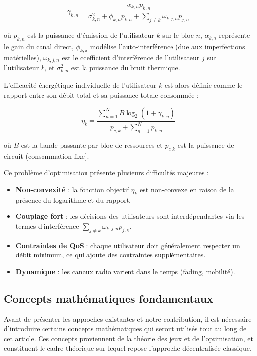 \documentclass[conference]{IEEEtran}
\begin{document}
\begin{equation} \label{eq:sinr_general}
\gamma_{k,n} = \frac{\alpha_{k,n} p_{k,n}}{\sigma_{k,n}^2 + \phi_{k,n} p_{k,n} + \sum_{j \neq k} \omega_{k,j,n} p_{j,n}}
\end{equation}

où $p_{k,n}$ est la puissance d'émission de l'utilisateur $k$ sur le bloc $n$, $\alpha_{k,n}$ représente le gain du canal direct, $\phi_{k,n}$ modélise l'auto-interférence (due aux imperfections matérielles), $\omega_{k,j,n}$ est le coefficient d'interférence de l'utilisateur $j$ sur l'utilisateur $k$, et $\sigma_{k,n}^2$ est la puissance du bruit thermique.

L'efficacité énergétique individuelle de l'utilisateur $k$ est alors définie comme le rapport entre son débit total et sa puissance totale consommée :

\begin{equation} \label{eq:ee}
\eta_k = \frac{\displaystyle\sum_{n=1}^{N} B \log_2(1 + \gamma_{k,n})}{p_{c,k} + \displaystyle\sum_{n=1}^{N} p_{k,n}}
\end{equation}

où $B$ est la bande passante par bloc de ressources et $p_{c,k}$ est la puissance de circuit (consommation fixe).

Ce problème d'optimisation présente plusieurs difficultés majeures :
\begin{itemize}
    \item \textbf{Non-convexité} : la fonction objectif $\eta_k$ est non-convexe en raison de la présence du logarithme et du rapport.
    \item \textbf{Couplage fort} : les décisions des utilisateurs sont interdépendantes via les termes d'interférence $\sum_{j \neq k} \omega_{k,j,n} p_{j,n}$.
    \item \textbf{Contraintes de QoS} : chaque utilisateur doit généralement respecter un débit minimum, ce qui ajoute des contraintes supplémentaires.
    \item \textbf{Dynamique} : les canaux radio varient dans le temps (fading, mobilité).
\end{itemize}

\subsection{Concepts mathématiques fondamentaux}

Avant de présenter les approches existantes et notre contribution, il est nécessaire d'introduire certains concepts mathématiques qui seront utilisés tout au long de cet article. Ces concepts proviennent de la théorie des jeux et de l'optimisation, et constituent le cadre théorique sur lequel repose l'approche décentralisée classique.
\end{document}
